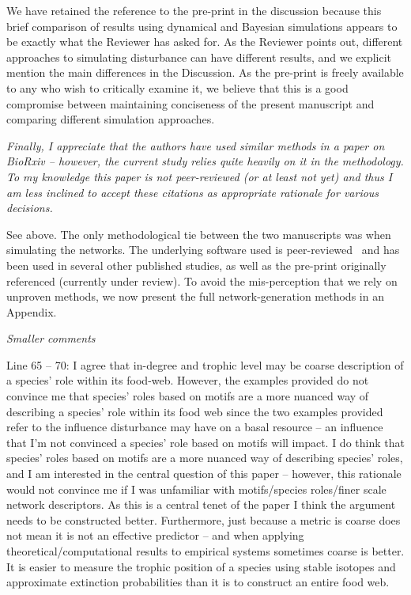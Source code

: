 \documentclass[12pt]{article}
\newcommand{\us}{\rm \setlength{\leftskip}{0.3cm} \setlength{\rightskip}{0.3cm}}
\newcommand{\them}{\it \setlength{\leftskip}{0cm} \setlength{\rightskip}{0cm}}
\begin{document}
We have retained the reference to the pre-print in the discussion because this brief comparison of results using dynamical and Bayesian simulations appears to be exactly what the Reviewer has asked for.
As the Reviewer points out, different approaches to simulating disturbance can have different results, and we explicit mention the main differences in the Discussion. 
As the pre-print is freely available to any who wish to critically examine it, we believe that this is a good compromise between maintaining conciseness of the present manuscript and comparing different simulation approaches.


\them
Finally, I appreciate that the authors have used similar methods in a paper on BioRxiv – however, the current study relies quite heavily on it in the methodology. To my knowledge this paper is not peer-reviewed (or at least not yet) and thus I am less inclined to accept these citations as appropriate rationale for various decisions.

\us See above. The only methodological tie between the two manuscripts was when simulating the networks. The underlying software used is peer-reviewed~\citep{Delmas2017} and has been used in several other published studies, as well as the pre-print originally referenced (currently under review). To avoid the mis-perception that we rely on unproven methods, we now present the full network-generation methods in an Appendix.

\them
Smaller comments

Line 65 – 70: I agree that in-degree and trophic level may be coarse description of a species’ role within its food-web. However, the examples provided do not convince me that species’ roles based on motifs are a more nuanced way of describing a species’ role within its food web since the two examples provided refer to the influence disturbance may have on a basal resource – an influence that I’m not convinced a species’ role based on motifs will impact.  
I do think that species’ roles based on motifs are a more nuanced way of describing species’ roles, and I am interested in the central question of this paper – however, this rationale would not convince me if I was unfamiliar with motifs/species roles/finer scale network descriptors.  As this is a central tenet of the paper I think the argument needs to be constructed better. Furthermore, just because a metric is coarse does not mean it is not an effective predictor – and when applying theoretical/computational results to empirical systems sometimes coarse is better. It is easier to measure the trophic position of a species using stable isotopes and approximate extinction probabilities than it is to construct an entire food web.
\end{document}
